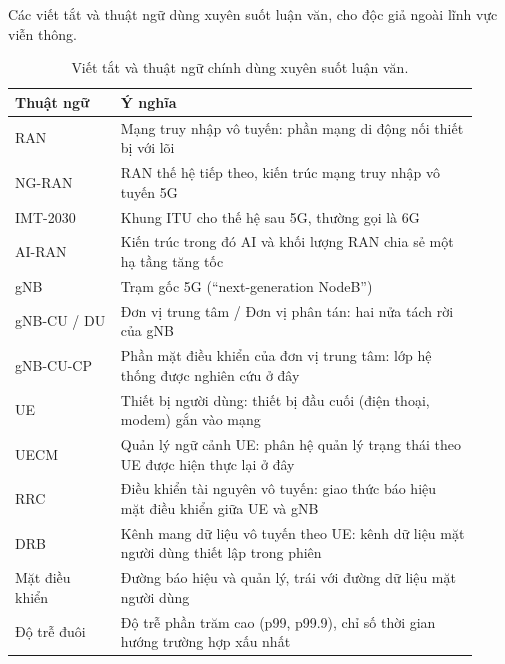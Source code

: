 Các viết tắt và thuật ngữ dùng xuyên suốt luận văn, cho độc giả ngoài lĩnh vực viễn thông.

\begin{table}[H]
\centering
\caption[Viết tắt và thuật ngữ chính]{Viết tắt và thuật ngữ chính dùng xuyên suốt luận văn.\label{tab:abbrev}}
\singlespacing
\footnotesize
\renewcommand{\arraystretch}{1.2}
\begin{tabular}{@{}p{0.21\linewidth} p{0.71\linewidth}@{}}
\hline\hline
Thuật ngữ & Ý nghĩa \\
\hline
RAN & Mạng truy nhập vô tuyến: phần mạng di động nối thiết bị với lõi \\
NG-RAN & RAN thế hệ tiếp theo, kiến trúc mạng truy nhập vô tuyến 5G \\
IMT-2030 & Khung ITU cho thế hệ sau 5G, thường gọi là 6G \\
AI-RAN & Kiến trúc trong đó AI và khối lượng RAN chia sẻ một hạ tầng tăng tốc \\
gNB & Trạm gốc 5G (``next-generation NodeB'') \\
gNB-CU / DU & Đơn vị trung tâm / Đơn vị phân tán: hai nửa tách rời của gNB \\
gNB-CU-CP & Phần mặt điều khiển của đơn vị trung tâm: lớp hệ thống được nghiên cứu ở đây \\
UE & Thiết bị người dùng: thiết bị đầu cuối (điện thoại, modem) gắn vào mạng \\
UECM & Quản lý ngữ cảnh UE: phân hệ quản lý trạng thái theo UE được hiện thực lại ở đây \\
RRC & Điều khiển tài nguyên vô tuyến: giao thức báo hiệu mặt điều khiển giữa UE và gNB \\
DRB & Kênh mang dữ liệu vô tuyến theo UE: kênh dữ liệu mặt người dùng thiết lập trong phiên \\
Mặt điều khiển & Đường báo hiệu và quản lý, trái với đường dữ liệu mặt người dùng \\
Độ trễ đuôi & Độ trễ phần trăm cao (p99, p99.9), chỉ số thời gian hướng trường hợp xấu nhất \\

\end{tabular}
\end{table}
